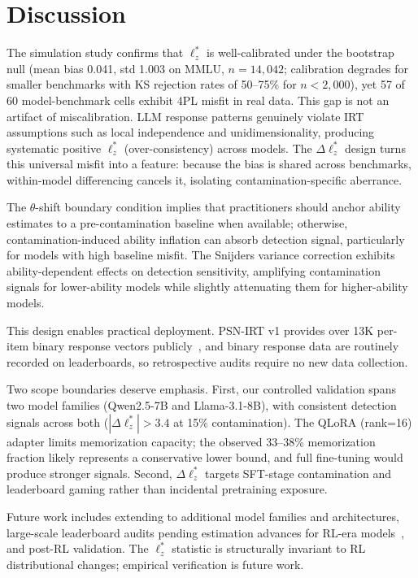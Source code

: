 \section{Discussion}\label{sec:discussion}

The simulation study confirms that $\ell_z^*$ is well-calibrated under the bootstrap null (mean bias 0.041, std 1.003 on MMLU, $n{=}14{,}042$; calibration degrades for smaller benchmarks with KS rejection rates of 50--75\% for $n < 2{,}000$), yet 57 of 60 model-benchmark cells exhibit 4PL misfit in real data. This gap is not an artifact of miscalibration. LLM response patterns genuinely violate IRT assumptions such as local independence and unidimensionality, producing systematic positive $\ell_z^*$ (over-consistency) across models. The $\Delta\ell_z^*$ design turns this universal misfit into a feature: because the bias is shared across benchmarks, within-model differencing cancels it, isolating contamination-specific aberrance.

The $\theta$-shift boundary condition implies that practitioners should anchor ability estimates to a pre-contamination baseline when available; otherwise, contamination-induced ability inflation can absorb detection signal, particularly for models with high baseline misfit.
The Snijders variance correction exhibits ability-dependent effects on detection sensitivity, amplifying contamination signals for lower-ability models while slightly attenuating them for higher-ability models.

This design enables practical deployment. PSN-IRT v1 provides over 13K per-item binary response vectors publicly~\citep{psnirt2026}, and binary response data are routinely recorded on leaderboards, so retrospective audits require no new data collection.

Two scope boundaries deserve emphasis. First, our controlled validation spans two model families (Qwen2.5-7B and Llama-3.1-8B), with consistent detection signals across both ($|\Delta\ell_z^*| > 3.4$ at 15\% contamination). The QLoRA (rank=16) adapter limits memorization capacity; the observed 33--38\% memorization fraction likely represents a conservative lower bound, and full fine-tuning would produce stronger signals. Second, $\Delta\ell_z^*$ targets SFT-stage contamination and leaderboard gaming rather than incidental pretraining exposure.

Future work includes extending to additional model families and architectures, large-scale leaderboard audits pending estimation advances for RL-era models~\citep{zhang2026rlvr}, and post-RL validation. The $\ell_z^*$ statistic is structurally invariant to RL distributional changes; empirical verification is future work.